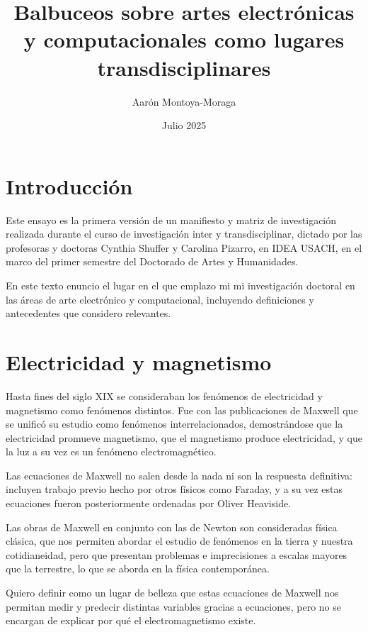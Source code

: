 \documentclass{article}
\title{Balbuceos sobre artes electrónicas y computacionales como lugares transdisciplinares}
\author{Aarón Montoya-Moraga}
\date{Julio 2025}
\begin{document}
\maketitle

\renewcommand*\contentsname{Tabla de contenidos}

\tableofcontents

\section{Introducción}

Este ensayo es la primera versión de un manifiesto y matriz de investigación realizada durante el curso de investigación inter y transdisciplinar, dictado por las profesoras y doctoras Cynthia Shuffer y Carolina Pizarro, en IDEA USACH, en el marco del primer semestre del Doctorado de Artes y Humanidades.

En este texto enuncio el lugar en el que emplazo mi mi investigación doctoral en las áreas de arte electrónico y computacional, incluyendo definiciones y antecedentes que considero relevantes.

\section{Electricidad y magnetismo}

Hasta fines del siglo XIX se consideraban los fenómenos de electricidad y magnetismo como fenómenos distintos. Fue con las publicaciones de Maxwell que se unificó su estudio como fenómenos interrelacionados, demostrándose que la electricidad promueve magnetismo, que el magnetismo produce electricidad, y que la luz a su vez es un fenómeno electromagnético.

Las ecuaciones de Maxwell no salen desde la nada ni son la respuesta definitiva: incluyen trabajo previo hecho por otros físicos como Faraday, y a su vez estas ecuaciones fueron posteriormente ordenadas por Oliver Heaviside.

Las obras de Maxwell en conjunto con las de Newton son consideradas física clásica, que nos permiten abordar el estudio de fenómenos en la tierra y nuestra cotidianeidad, pero que presentan problemas e imprecisiones a escalas mayores que la terrestre, lo que se aborda en la física contemporánea.

Quiero definir como un lugar de belleza que estas ecuaciones de Maxwell nos permitan medir y predecir distintas variables gracias a ecuaciones, pero no se encargan de explicar por qué el electromagnetismo existe.
\end{document}
